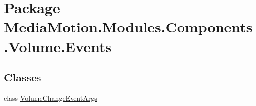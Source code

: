 \hypertarget{namespace_media_motion_1_1_modules_1_1_components_1_1_volume_1_1_events}{\section{Package Media\+Motion.\+Modules.\+Components.\+Volume.\+Events}
\label{namespace_media_motion_1_1_modules_1_1_components_1_1_volume_1_1_events}
}
\subsection*{Classes}
\begin{DoxyCompactItemize}
\item 
class \hyperlink{class_media_motion_1_1_modules_1_1_components_1_1_volume_1_1_events_1_1_volume_change_event_args}{Volume\+Change\+Event\+Args}
\end{DoxyCompactItemize}
